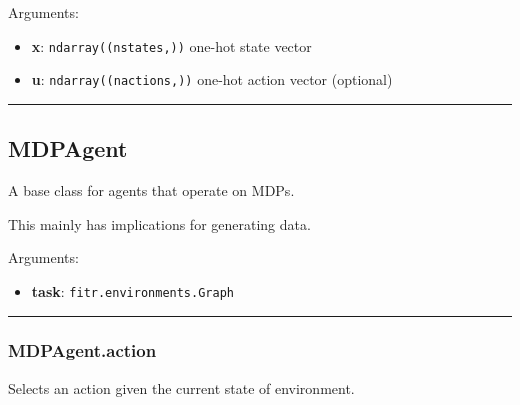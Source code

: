 Arguments:

\begin{itemize}
\tightlist
\item
  \textbf{x}: \texttt{ndarray((nstates,))} one-hot state vector
\item
  \textbf{u}: \texttt{ndarray((nactions,))} one-hot action vector
  (optional)
\end{itemize}

\begin{center}\rule{0.5\linewidth}{\linethickness}\end{center}

\hypertarget{mdpagent}{%
\subsection{MDPAgent}\label{mdpagent}}

\begin{Shaded}
\begin{Highlighting}[]
\end{Highlighting}
\end{Shaded}

A base class for agents that operate on MDPs.

This mainly has implications for generating data.

Arguments:

\begin{itemize}
\tightlist
\item
  \textbf{task}: \texttt{fitr.environments.Graph}
\end{itemize}

\begin{center}\rule{0.5\linewidth}{\linethickness}\end{center}

\hypertarget{mdpagent.action}{%
\subsubsection{MDPAgent.action}\label{mdpagent.action}}

\begin{Shaded}
\begin{Highlighting}[]
\end{Highlighting}
\end{Shaded}

Selects an action given the current state of environment.

